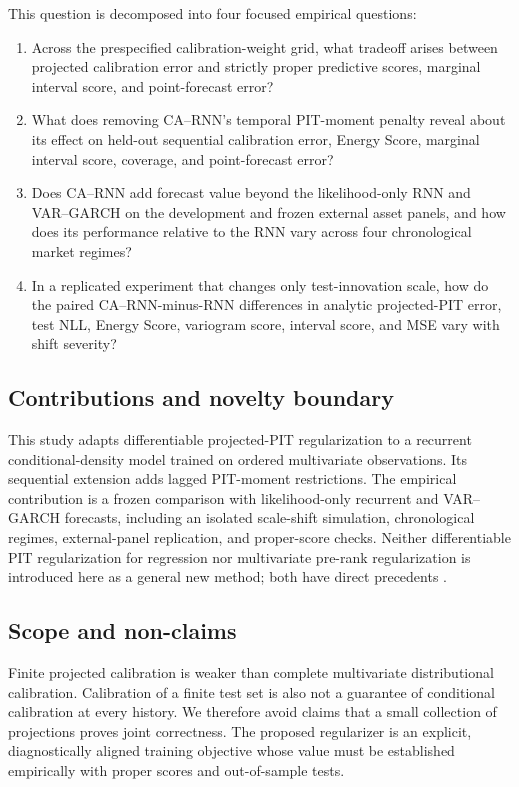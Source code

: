 \documentclass[11pt]{article}
\begin{document}
This question is decomposed into four focused empirical questions:
\begin{enumerate}[label=RQ\arabic*.]
    \item Across the prespecified calibration-weight grid, what tradeoff arises
    between projected calibration error and strictly proper predictive scores,
    marginal interval score, and point-forecast error?
    \item What does removing CA--RNN's temporal PIT-moment penalty reveal about
    its effect on held-out sequential calibration error, Energy Score, marginal
    interval score, coverage, and point-forecast error?
    \item Does CA--RNN add forecast value beyond the likelihood-only RNN and
    VAR--GARCH on the development and frozen external asset panels, and how does
    its performance relative to the RNN vary across four chronological market
    regimes?
    \item In a replicated experiment that changes only test-innovation scale,
    how do the paired CA--RNN-minus-RNN differences in analytic projected-PIT
    error, test NLL, Energy Score, variogram score, interval score, and MSE vary
    with shift severity?
\end{enumerate}

\subsection{Contributions and novelty boundary}

This study adapts differentiable projected-PIT regularization to a recurrent
conditional-density model trained on ordered multivariate observations. Its
sequential extension adds lagged PIT-moment restrictions. The empirical
contribution is a frozen comparison with likelihood-only recurrent and
VAR--GARCH forecasts, including an isolated scale-shift simulation,
chronological regimes, external-panel replication, and proper-score checks.
Neither differentiable PIT regularization for regression nor multivariate
pre-rank regularization is introduced here as a general new method; both have
direct precedents \cite{utpala2020quantile,dheur2023large,laajil2026prerank}.

\subsection{Scope and non-claims}

Finite projected calibration is weaker than complete multivariate distributional
calibration. Calibration of a finite test set is also not a guarantee of
conditional calibration at every history. We therefore avoid claims
that a small collection of projections proves joint correctness. The proposed
regularizer is an explicit, diagnostically aligned training objective whose value
must be established empirically with proper scores and out-of-sample tests.
\end{document}
